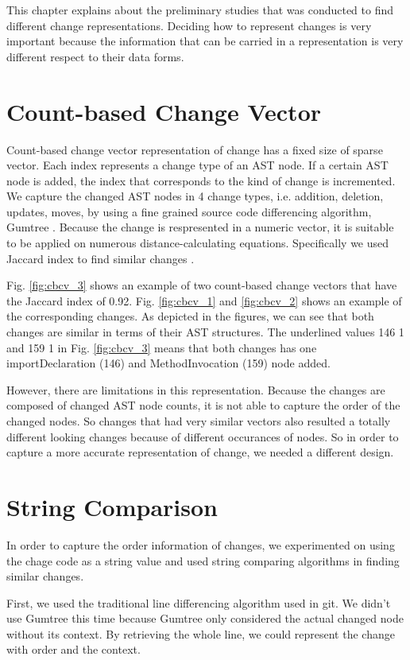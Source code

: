 This chapter explains about the preliminary studies that was conducted to find different change representations.
Deciding how to represent changes is very important because the information that can be carried in a representation is very different respect to their data forms.

\section{Count-based Change Vector}
Count-based change vector representation of change has a fixed size of sparse vector.
Each index represents a change type of an AST node.
If a certain AST node is added, the index that corresponds to the kind of change is incremented.
We capture the changed AST nodes in 4 change types, i.e. addition, deletion, updates, moves, by using a fine grained source code differencing algorithm, Gumtree \cite{falleri2014fine}.
Because the change is respresented in a numeric vector, it is suitable to be applied on numerous distance-calculating equations.
Specifically we used Jaccard index to find similar changes \cite{cha2007comprehensive}.

Fig. \ref{fig:cbcv_3} shows an example of two count-based change vectors that have the Jaccard index of 0.92.
Fig. \ref{fig:cbcv_1} and \ref{fig:cbcv_2} shows an example of the corresponding changes.  
As depicted in the figures, we can see that both changes are similar in terms of their AST structures.
The underlined values 146 1 and 159 1 in Fig. \ref{fig:cbcv_3} means that both changes has one importDeclaration (146) and MethodInvocation (159) node added.

However, there are limitations in this representation.
Because the changes are composed of changed AST node counts, it is not able to capture the order of the changed nodes.
So changes that had very similar vectors also resulted a totally different looking changes because of different occurances of nodes.
So in order to capture a more accurate representation of change, we needed a different design. 

\section{String Comparison}
In order to capture the order information of changes, we experimented on using the chage code as a string value and used string comparing algorithms in finding similar changes.

First, we used the traditional line differencing algorithm used in git.
We didn't use Gumtree this time because Gumtree only considered the actual changed node without its context.
By retrieving the whole line, we could represent the change with order and the context.

